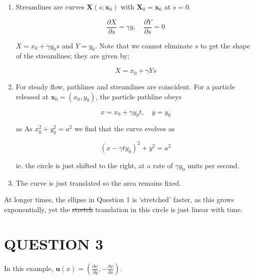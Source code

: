 \documentclass[a4paper]{article}
\begin{document}
\begin{enumerate}
	\item Streamlines are curves $ \mathbf{X}(s; \mathbf{x}_{0}) $ with $ \mathbf{X}_{0} = \mathbf{x}_{0} $ at $ s = 0 $. 
	
	\[ \frac{\partial X }{\partial s} = \gamma y, \quad \frac{\partial Y }{\partial s} = 0 \]
	
	$ X = x_{0} + \gamma y_{0} s $ and $ Y = y_{0}$. Note that we cannot eliminate $ s $ to get the shape of the streamlines; they are given by;
	
	\[ X = x_{0} + \gamma Y s \]
	
	\item For steady flow, pathlines and streamlines are coincident. For a particle released at $ \mathbf{x}_{0} = (x_{0},y_{0}) $, the particle pathline obeys
	
	\[ x = x_{0} + \gamma y_{0} t, \quad y = y_{0}  \]
	
	as  As $ x_{0}^{2} + y_{0}^{2} = a^{2} $ we find that the curve evolves as
	
	\[ (x - \gamma t y_{0})^{2} + y^{2} = a^{2}  \]
	
	ie. the circle is just shifted to the right, at a rate of $ \gamma y_{0} $ units per second. 
	
	\item The curve is just translated so the area remains fixed.

	
	
\end{enumerate}

At longer times, the ellipse in Question 1 is `stretched' faster, as this grows exponentially, yet the \st{stretch} translation in this circle is just linear with time. 
	


\section{QUESTION 3}

In this example, $ \mathbf{u}(x) = (\frac{\partial \psi }{\partial y}, - \frac{\partial \psi }{\partial x}) $.
\end{document}
